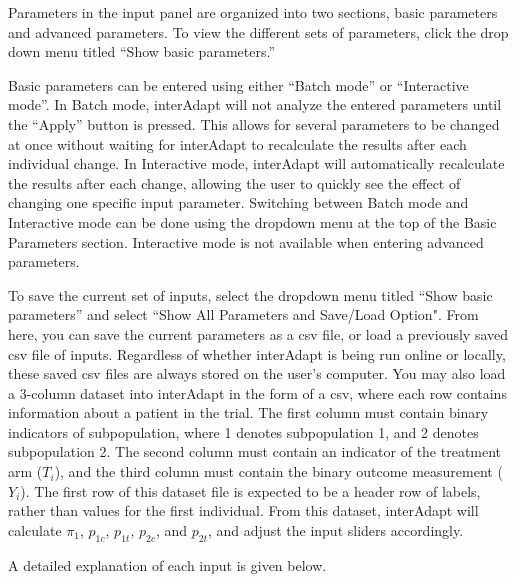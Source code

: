\documentclass{article}
\newcommand{\interAdapt}{\textsf{interAdapt }}
\begin{document}
Parameters in the input panel are organized into two sections, basic parameters and advanced parameters. To view the different sets of parameters, click the drop down menu titled “Show basic parameters.” 

Basic parameters can be entered using either “Batch mode” or “Interactive mode”. In Batch mode, \interAdapt will not analyze the entered parameters until the “Apply” button is pressed. This allows for several parameters to be changed at once without waiting for \interAdapt to recalculate the results after each individual change. In Interactive mode, \interAdapt will automatically recalculate the results after each change, allowing the user to quickly see the effect of changing one specific input parameter. Switching between Batch mode and Interactive mode can be done using the dropdown menu at the top of the Basic Parameters section. Interactive mode is not available when entering advanced parameters.

To save the current set of inputs, select the dropdown menu titled “Show basic parameters” and select “Show All Parameters and Save/Load Option". From here, you can save the current parameters as a csv file, or load a previously saved csv file of inputs. Regardless of whether \interAdapt is being run online or locally, these saved csv files are always stored on the user's computer. You may also load a 3-column dataset into \interAdapt in the form of a csv, where each row contains information about a patient in the trial. The first column must contain binary indicators of subpopulation, where 1 denotes subpopulation 1, and 2 denotes subpopulation 2. The second column must contain an indicator of the treatment arm ($T_i$), and the third column must contain the binary outcome measurement ($Y_i$). The first row of this dataset file is expected to be a header row of labels, rather than values for the first individual. From this dataset, \interAdapt will calculate $π_1$, $p_{1c}$, $p_{1t}$, $p_{2c}$, and $p_{2t}$, and adjust the input sliders accordingly.

A detailed explanation of each input is given below.
\end{document}

